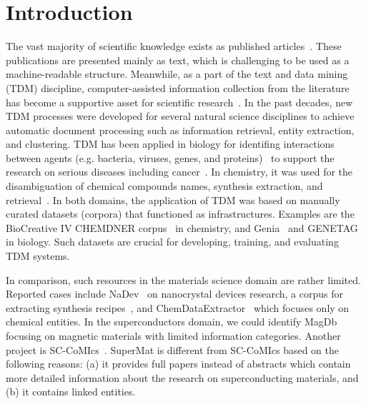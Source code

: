 \documentclass[]{interact}
\theoremstyle{plain}%
\theoremstyle{definition}
\theoremstyle{remark}
\begin{document}
\section{Introduction}
The vast majority of scientific knowledge exists as published articles~\cite{Grigas2017JustGI, Khabsa2014TheNO, OrduaMalea2015MethodsFE, Bjrk2009ScientificJP}. 
These publications are presented mainly as text, which is challenging to be used as a machine-readable structure. 
Meanwhile, as a part of the text and data mining (TDM) discipline, computer-assisted information collection from the literature has become a supportive asset for scientific research~\cite{doi:10.1063/5.0021106}. 
In the past decades, new TDM processes were developed for several natural science disciplines to achieve automatic document processing such as information retrieval, entity extraction, and clustering.  
TDM has been applied in biology for identifing interactions between agents (e.g. bacteria, viruses, genes, and proteins)~\cite{10.1371/journal.pone.0004554, Krallinger2010, Krallinger2009ExtractionOH} to support the research on serious diseases including cancer~\cite{Krasnitz2019CancerB}. 
In chemistry, it was used for the disambiguation of chemical compounds names, synthesis extraction, and retrieval~\cite{Hawizy2011ChemicalTaggerAT}.
In both domains, the application of TDM was based on manually curated datasets (corpora) that functioned as infrastructures. Examples are the BioCreative IV CHEMDNER corpus~\cite{Krallinger2015TheCC} in chemistry, and Genia~\cite{Kim2003GENIAC} and GENETAG~\cite{Tanabe2005GENETAGAT, Ohta2009IncorporatingGA} in biology. Such datasets are crucial for developing, training, and evaluating TDM systems.

In comparison, such resources in the materials science domain are rather limited. 
Reported cases include NaDev~\cite{Dieb2016} on nanocrystal devices research, a corpus for extracting synthesis recipes~\cite{kononova_text-mined_2019}, and ChemDataExtractor~\cite{court2018auto} which focuses only on chemical entities. In the superconductors domain, we could identify MagDb~\cite{court_magnetic_2020} focusing on magnetic materials with limited information categories. Another project is SC-CoMIcs~\cite{yamaguchi-etal-2020-sc}.
SuperMat is different from SC-CoMIcs based on the following reasons: (a) it provides full papers instead of abstracts which contain more detailed information about the research on superconducting materials, and (b) it contains linked entities. 
\end{document}
